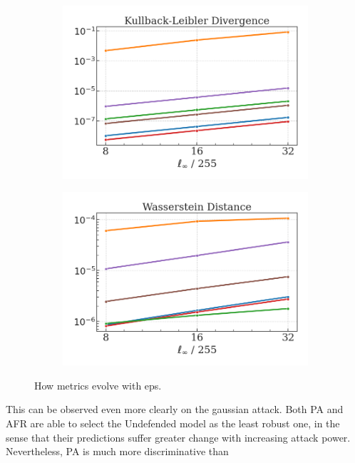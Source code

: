 \begin{figure}[H]
\begin{subfigure}[b]{0.22\textwidth}
        \includegraphics[width=\textwidth]{img/results_discussion/adversarial/PGD_KL_eps.png}
    \end{subfigure}
    \hfill
    \begin{subfigure}[b]{0.22\textwidth}
        \centering
        \vspace{-5pt}
        \includegraphics[width=\textwidth]{img/results_discussion/adversarial/PGD_W_eps.png}
    \end{subfigure}
    \caption{How metrics evolve with eps.}
    \label{fig:gaussian_optimization}
\end{figure}

This can be observed even more clearly on the gaussian attack. Both PA and AFR are able to select the Undefended model as the least robust one, in the sense that their predictions suffer greater change with increasing attack power. Nevertheless, PA is much more discriminative than

